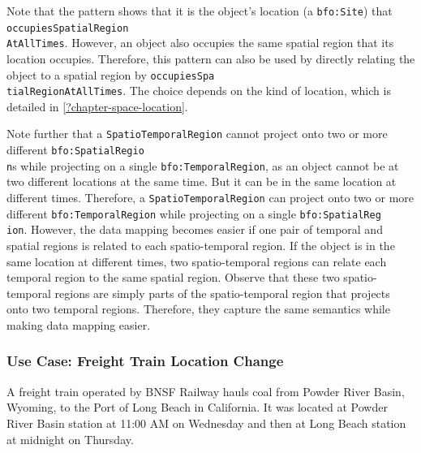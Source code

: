 Note that the pattern shows that it is the object's location (a \texttt{bfo:Site}) that \texttt{occupiesSpatialRegion\\AtAllTimes}. However, an object also occupies the same spatial region that its location occupies. Therefore, this pattern can also be used by directly relating the object to a spatial region by \texttt{occupiesSpa\\tialRegionAtAllTimes}. The choice depends on the kind of location, which is detailed in \cref{?chapter-space-location}.   

Note further that a \texttt{SpatioTemporalRegion} cannot project onto two or more different \texttt{bfo:SpatialRegio\\n}s while projecting on a single \texttt{bfo:TemporalRegion}, as an object cannot be at two different locations at the same time. But it can be in the same location at different times. Therefore, a \texttt{SpatioTemporalRegion} can project onto two or more different \texttt{bfo:TemporalRegion} while projecting on a single \texttt{bfo:SpatialReg\\ion}. However, the data mapping becomes easier if one pair of temporal and spatial regions is related to each spatio-temporal region. If the object is in the same location at different times, two spatio-temporal regions can relate each temporal region to the same spatial region. Observe that these two spatio-temporal regions are simply parts of the spatio-temporal region that projects onto two temporal regions. Therefore, they capture the same semantics while making data mapping easier.     

\subsubsection*{Use Case: Freight Train Location Change} 
A freight train operated by BNSF Railway hauls coal from Powder River Basin, Wyoming, to the Port of Long Beach in California. It was located at Powder River Basin station at 11:00 AM on Wednesday and then at Long Beach station at midnight on Thursday.

